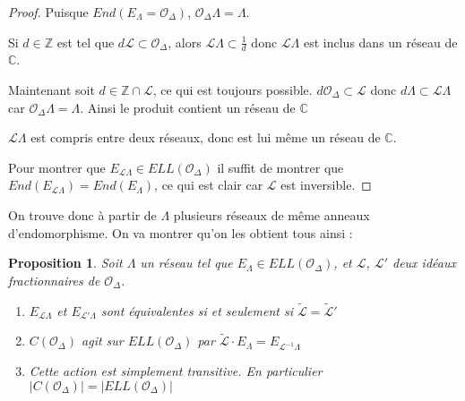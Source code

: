 \documentclass{article}
\newcommand{\Z}[0]{\mathbb{Z}}
\newcommand{\C}[0]{\mathbb{C}}
\newcommand{\OR}[0]{\mathcal{O}}
\newcommand{\LR}[0]{\mathcal{L}}
\newcommand{\CL}[0]{\tilde{\LR}}
\newtheorem{Prop}[The]{Proposition}
\begin{document}
\begin{proof}
	Puisque $End(E_{\Lambda} = \OR_{\Delta})$, $\OR_{\Delta}\Lambda = \Lambda$. 
	
	Si $d\in\Z$ est tel que $d\LR\subset\OR_{\Delta}$, alors $\LR\Lambda\subset\frac{1}{d}$ donc $\LR\Lambda$ est inclus dans un réseau de $\C$. 
	
	Maintenant soit $d\in\Z\cap\LR$, ce qui est toujours possible. $d\OR_{\Delta}\subset\LR$ donc $d\Lambda\subset\LR\Lambda$ car $\OR_{\Delta}\Lambda = \Lambda$. Ainsi le produit contient un réseau de $\C$
	
	$\LR\Lambda$ est compris entre deux réseaux, donc est lui même un réseau de $\C$.
	
	Pour montrer que $E_{\LR\Lambda}\in ELL(\OR_{\Delta})$ il suffit de montrer que $End(E_{\LR\Lambda}) = End(E_{\Lambda})$, ce qui est clair car $\LR$ est inversible. 
\end{proof}

On trouve donc à partir de $\Lambda$ plusieurs réseaux de même anneaux d'endomorphisme. On va montrer qu'on les obtient tous ainsi :

\begin{Prop}
	Soit $\Lambda$ un réseau tel que $E_{\Lambda}\in ELL(\OR_{\Delta})$, et $\LR$, $\LR'$ deux idéaux fractionnaires de $\OR_{\Delta}$. 
	
	\begin{enumerate}
		\item $E_{\LR\Lambda}$ et $E_{\LR'\Lambda}$ sont équivalentes si et seulement si $\CL = \CL'$
		\item $C(\OR_{\Delta})$ agit sur $ELL(\OR_{\Delta})$ par $\CL\cdot E_{\Lambda} = E_{\LR^{-1}\Lambda}$
		\item Cette action est simplement transitive. En particulier $\left| C(\OR_{\Delta})\right| = \left| ELL(\OR_{\Delta})\right| $
	\end{enumerate}
\end{Prop}
\end{document}

